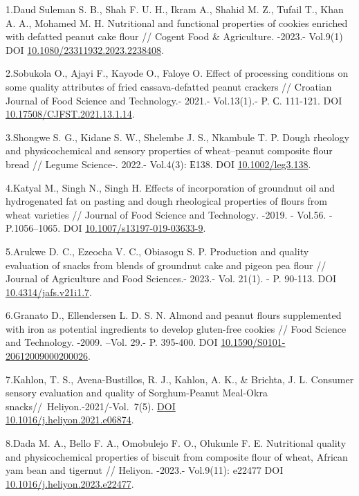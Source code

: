 \begin{references}
1.Daud Suleman S. B., Shah F. U. H., Ikram A., Shahid M. Z., Tufail T.,
Khan A. A., Mohamed M. H. Nutritional and functional properties of
cookies enriched with defatted peanut cake flour // Cogent Food \&
Agriculture. -2023.- Vol.9(1) DOI
\href{https://doi.org/10.1080/23311932.2023.2238408}{10.1080/23311932.2023.2238408}.

2.Sobukola O., Ajayi F., Kayode O., Faloye O. Effect of processing
conditions on some quality attributes of fried cassava-defatted peanut
crackers // Croatian Journal of Food Science and Technology.-
2021.- Vol.13(1).- P. С. 111-121. DOI
\href{https://doi.org/10.17508/CJFST.2021.13.1.14}{10.17508/CJFST.2021.13.1.14}.

3.Shongwe S. G., Kidane S. W., Shelembe J. S., Nkambule T. P. Dough
rheology and physicochemical and sensory properties of wheat--peanut
composite flour bread // Legume Science-. 2022.- Vol.4(3): Е138.
DOI \href{https://doi.org/10.1002/leg3.138}{10.1002/leg3.138}.

4.Katyal M., Singh N., Singh H. Effects of incorporation of groundnut
oil and hydrogenated fat on pasting and dough rheological properties of
flours from wheat varieties // Journal of Food Science and
Technology\emph{.} -2019. - Vol.56. - P.1056--1065. DOI
\href{https://doi.org/10.1007/s13197-019-03633-9}{10.1007/s13197-019-03633-9}.

5.Arukwe D. C., Ezeocha V. C., Obiasogu S. P. Production and quality
evaluation of snacks from blends of groundnut cake and pigeon pea flour
// Journal of Agriculture and Food Sciences.- 2023.- Vol. 21(1).
- P. 90-113. DOI
\href{https://doi.org/10.4314/jafs.v21i1.7}{10.4314/jafs.v21i1.7}.

6.Granato D., Ellendersen L. D. S. N. Almond and peanut flours
supplemented with iron as potential ingredients to develop gluten-free
cookies // Food Science and Technology. -2009. --Vol. 29.- P. 395-400.
DOI
\href{https://doi.org/10.1590/S0101-20612009000200026}{10.1590/S0101-20612009000200026}.

7.Kahlon, T. S., Avena-Bustillos, R. J., Kahlon, A. K., \& Brichta, J.
L. Consumer sensory evaluation and quality of Sorghum-Peanut Meal-Okra
snacks//~Heliyon.-2021/-Vol.~7(5).
\href{https://doi.org/10.1016/j.heliyon.2021.e06874}{DOI\\
10.1016/j.heliyon.2021.e06874}.

8.Dada M. A., Bello F. A., Omobulejo F. O., Olukunle F. E. Nutritional
quality and physicochemical properties of biscuit from composite flour
of wheat, African yam bean and tigernut // Heliyon. -2023.-
Vol.9(11): e22477 DOI
\href{https://doi.org/10.1016/j.heliyon.2023.e22477}{10.1016/j.heliyon.2023.e22477}.


\end{references}
